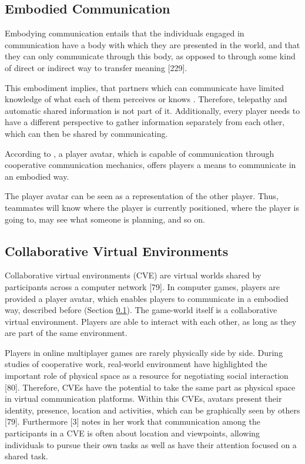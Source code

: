 \subsection{Embodied Communication}
\label{section:Embodied Communication}

Embodying communication entails that the individuals engaged in communication have a body with which they are presented in the world, and that they can only communicate through this body, as opposed to through some kind of direct or indirect way to transfer meaning \autocite{Galantucci2012TheHumans}[229].

This embodiment implies, that partners which can communicate have limited knowledge of what each of them perceives or knows \autocite{Galantucci2012TheHumans}. Therefore, telepathy and automatic shared information is not part of it. Additionally, every player needs to have a different perspective to gather information separately from each other, which can then be shared by communicating. 

According to \textcite{Vaddi2016Investigating2}, a player avatar, which is capable of communication through cooperative communication mechanics, offers players a means to communicate in an embodied way.

The player avatar can be seen as a representation of the other player. Thus, teammates will know where the player is currently positioned, where the player is going to, may see what someone is planning, and so on.


\subsection{Collaborative Virtual Environments}
\label{section:Collaborative Virtual Environments}

Collaborative virtual environments (CVE) are virtual worlds shared by participants across a computer network \autocite{Benford2001CollaborativeEnvironments}[79]. In computer games, players are provided a player avatar, which enables players to communicate in a embodied way, described before (Section \ref{section:Embodied Communication}). The game-world itself is a collaborative virtual environment. Players are able to interact with each other, as long as they are part of the same environment.

Players in online multiplayer games are rarely physically side by side. During studies of cooperative work, real-world environment have highlighted the important role of physical space as a resource for negotiating social interaction \autocite{Benford2001CollaborativeEnvironments}[80]. Therefore, CVEs have the potential to take the same part as physical space in virtual communication platforms.
Within this CVEs, avatars present their identity, presence, location and activities, which can be graphically seen by others \autocite{Benford2001CollaborativeEnvironments}[79].
Furthermore \textcite{Maher2011DesignersEnvironments}[3] notes in her work that communication among the participants in a CVE is often about location and viewpoints, allowing individuals to pursue their own tasks as well as have their attention focused on a shared task.